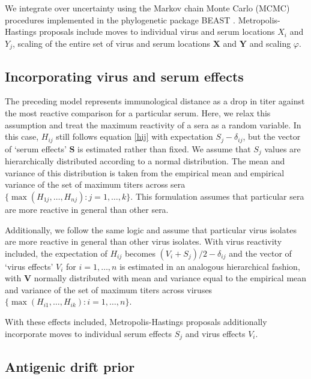 \documentclass[11pt,oneside,letterpaper]{article}
\newcommand{\mdssd}{\varphi}						%
\newcommand{\vn}{n}									%
\newcommand{\sn}{k}									%
\begin{document}
We integrate over uncertainty using the Markov chain Monte Carlo (MCMC) procedures implemented in the phylogenetic package BEAST \cite{BEAST,BEAST17}.
Metropolis-Hastings proposals include moves to individual virus and serum locations $X_i$ and $Y_j$, scaling of the entire set of virus and serum locations $\mathbf{X}$ and $\mathbf{Y}$ and scaling $\mdssd$.

\subsection*{Incorporating virus and serum effects}

The preceding model represents immunological distance as a drop in titer against the most reactive comparison for a particular serum.  
Here, we relax this assumption and treat the maximum reactivity of a sera as a random variable.
In this case, $H_{ij}$ still follows equation \ref{hij} with expectation $S_j - \delta_{ij}$, but the vector of `serum effects' $\mathbf{S}$ is estimated rather than fixed.
We assume that $S_j$ values are hierarchically distributed according to a normal distribution.
The mean and variance of this distribution is taken from the empirical mean and empirical variance of the set of maximum titers across sera $\{ \max ( H_{1j},\ldots,H_{\vn j} ) : j = 1,\ldots,\sn \}$.
This formulation assumes that particular sera are more reactive in general than other sera.

Additionally, we follow the same logic and assume that particular virus isolates are more reactive in general than other virus isolates.
With virus reactivity included, the expectation of $H_{ij}$ becomes $(V_i+S_j)/2 - \delta_{ij}$ and the vector of `virus effects' $V_i$ for $i = 1,\ldots, \vn$ is estimated in an analogous hierarchical fashion, with $\mathbf{V}$ normally distributed with mean and variance equal to the empirical mean and variance of the set of maximum titers across viruses $\{ \max ( H_{i1},\ldots,H_{i \sn} ) : i = 1,\ldots,\vn \}$.

With these effects included, Metropolis-Hastings proposals additionally incorporate moves to individual serum effects $S_j$ and virus effects $V_i$.

\subsection*{Antigenic drift prior}
\end{document}
